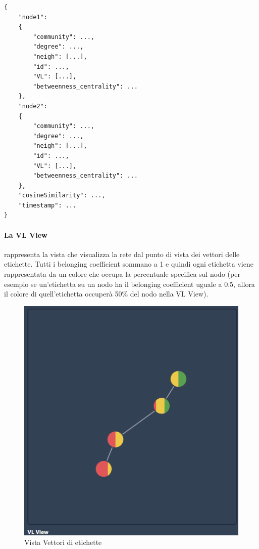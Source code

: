 \documentclass[a4paper,12pt]{report}
\begin{document}
			\begin{lstlisting}
{
	"node1": 
	{
		"community": ...,
		"degree": ...,
		"neigh": [...],
		"id": ...,
		"VL": [...],
		"betweenness_centrality": ...
	},
	"node2": 
	{
		"community": ...,
		"degree": ...,
		"neigh": [...],
		"id": ...,
		"VL": [...],
		"betweenness_centrality": ...
	},
	"cosineSimilarity": ...,
	"timestamp": ...
}
			\end{lstlisting}


\pagebreak

			\paragraph*{La VL View} rappresenta la vista che visualizza la rete dal punto di vista dei vettori delle etichette. Tutti i belonging coefficient sommano a 1 e quindi ogni etichetta viene rappresentata da un colore che occupa la percentuale specifica sul nodo (per esempio se un'etichetta su un nodo ha il belonging coefficient uguale a 0.5, allora il colore di quell'etichetta occuperà 50\% del nodo nella VL View). 
			
			\begin{center}
			\begin{figure}[H]
			\centering
			\includegraphics[width=0.9\linewidth,keepaspectratio]{vlview}
			\caption{Vista Vettori di etichette}
			\end{figure}
			\end{center}
\end{document}
